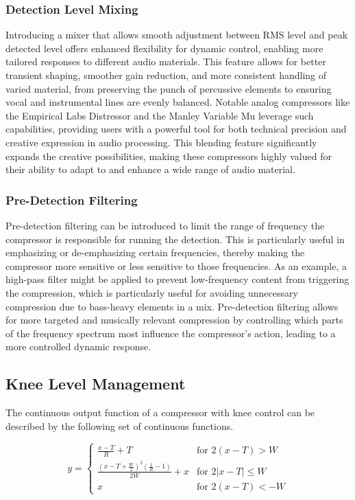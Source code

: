 \documentclass[10pt]{article}
\begin{document}
\begin{multicols*}{2}
                \subsubsection{Detection Level Mixing}
                    Introducing a mixer that allows smooth adjustment between RMS level and peak detected level offers enhanced flexibility for dynamic control, enabling more tailored responses to different audio materials. This feature allows for better transient shaping, smoother gain reduction, and more consistent handling of varied material, from preserving the punch of percussive elements to ensuring vocal and instrumental lines are evenly balanced. Notable analog compressors like the Empirical Labs Distressor and the Manley Variable Mu leverage such capabilities, providing users with a powerful tool for both technical precision and creative expression in audio processing. This blending feature significantly expands the creative possibilities, making these compressors highly valued for their ability to adapt to and enhance a wide range of audio material.

                \subsubsection{Pre-Detection Filtering}
                    Pre-detection filtering can be introduced to limit the range of frequency the compressor is responsible for running the detection. This is particularly useful in emphasizing or de-emphasizing certain frequencies, thereby making the compressor more sensitive or less sensitive to those frequencies. As an example, a high-pass filter might be applied to prevent low-frequency content from triggering the compression, which is particularly useful for avoiding unnecessary compression due to bass-heavy elements in a mix. Pre-detection filtering allows for more targeted and musically relevant compression by controlling which parts of the frequency spectrum most influence the compressor's action, leading to a more controlled dynamic response.


            \subsection{Knee Level Management}
                The continuous output function of a compressor with knee control can be described by the following set of continuous functions.

                \begin{equation}
                    y=
                    \begin{cases}
                        \frac{x-T}{R}+T & \text{for $2(x-T)>W$}\\[5pt]
                        \frac{(x-T+\frac{W}{2})^2(\frac{1}{R}-1)}{2W}+x & \text{for $2\left\lvert x-T\right\rvert\leq W$}\\[5pt]
                        x & \text{for $2(x-T)<-W$}
                    \end{cases}
                \end{equation}


\end{multicols*}
\end{document}
